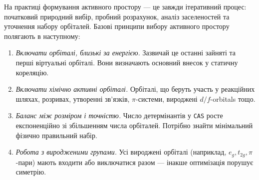 На практиці формування активного простору --- це завжди ітеративний процес:
початковий природний вибір, пробний розрахунок, аналіз заселеностей та
уточнення набору орбіталей. Базові принципи вибору активного простору полягають в наступному:
\begin{enumerate}
    \item \emph{Включати орбіталі, близькі за енергією.}
    Зазвичай це останні зайняті та перші віртуальні орбіталі. Вони визначають
    основний внесок у статичну кореляцію.

    \item \emph{Включати хімічно активні орбіталі.}
    Орбіталі, що беруть участь у реакційних шляхах, розривах, утворенні зв'язків,
    \(\pi\)-системи, вироджені \(d/f\)-orbitals тощо.

    \item \emph{Баланс між розміром і точністю.}
    Число детермінантів у \texttt{CAS} росте експоненційно зі збільшенням
    числа орбіталей. Потрібно знайти мінімальний фізично правильний набір.


    \item \emph{Робота з виродженими групами.}
    Усі вироджені орбіталі (наприклад, \(e_g, t_{2g}, \pi\)-пари) мають входити
    або виключатися разом — інакше оптимізація порушує симетрію.
\end{enumerate}

